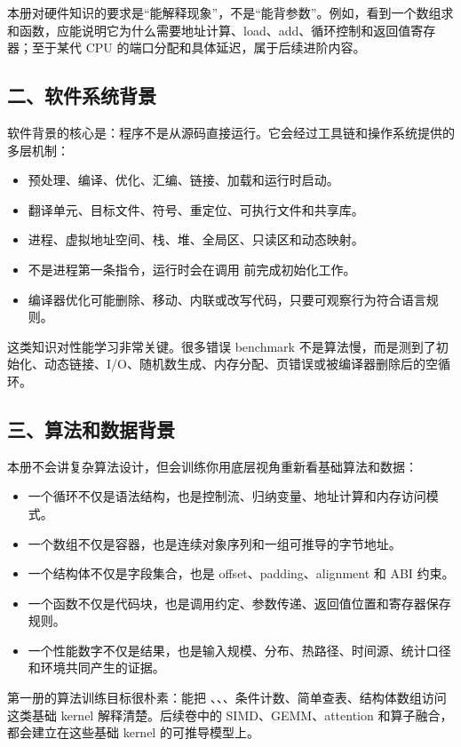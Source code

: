 本册对硬件知识的要求是“能解释现象”，不是“能背参数”。例如，看到一个数组求和函数，应能说明它为什么需要地址计算、load、add、循环控制和返回值寄存器；至于某代 CPU 的端口分配和具体延迟，属于后续进阶内容。

\subsection*{二、软件系统背景}

软件背景的核心是：程序不是从源码直接运行。它会经过工具链和操作系统提供的多层机制：

\begin{itemize}
  \item 预处理、编译、优化、汇编、链接、加载和运行时启动。
  \item 翻译单元、目标文件、符号、重定位、可执行文件和共享库。
  \item 进程、虚拟地址空间、栈、堆、全局区、只读区和动态映射。
  \item {} 不是进程第一条指令，运行时会在调用  前完成初始化工作。
  \item 编译器优化可能删除、移动、内联或改写代码，只要可观察行为符合语言规则。
\end{itemize}

这类知识对性能学习非常关键。很多错误 benchmark 不是算法慢，而是测到了初始化、动态链接、I/O、随机数生成、内存分配、页错误或被编译器删除后的空循环。

\subsection*{三、算法和数据背景}

本册不会讲复杂算法设计，但会训练你用底层视角重新看基础算法和数据：

\begin{itemize}
  \item 一个循环不仅是语法结构，也是控制流、归纳变量、地址计算和内存访问模式。
  \item 一个数组不仅是容器，也是连续对象序列和一组可推导的字节地址。
  \item 一个结构体不仅是字段集合，也是 offset、padding、alignment 和 ABI 约束。
  \item 一个函数不仅是代码块，也是调用约定、参数传递、返回值位置和寄存器保存规则。
  \item 一个性能数字不仅是结果，也是输入规模、分布、热路径、时间源、统计口径和环境共同产生的证据。
\end{itemize}

第一册的算法训练目标很朴素：能把 、、、条件计数、简单查表、结构体数组访问这类基础 kernel 解释清楚。后续卷中的 SIMD、GEMM、attention 和算子融合，都会建立在这些基础 kernel 的可推导模型上。

